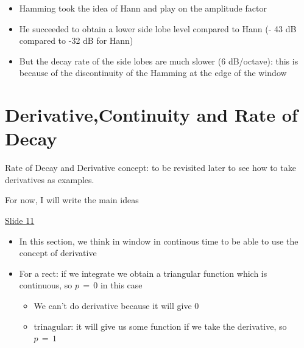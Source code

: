 \documentclass[12pt,a4paper]{book}
\begin{document}
\begin{itemize}
    \begin{itemize}
        \item Hamming took the idea of Hann and play on the amplitude factor
        
        \item He succeeded to obtain a lower side lobe level compared to Hann (- 43 dB compared to -32 dB for Hann)
        
        \item But the decay rate of the side lobes are much slower (6 dB/octave): this is because of the discontinuity of  the Hamming at the edge of the window
        
    \end{itemize}


\end{itemize}


\section{Derivative,Continuity and Rate of Decay}

 Rate of Decay and Derivative concept: to be revisited later to see how to take derivatives as examples.

For now, I will write the main ideas

\underline{Slide 11}

\begin{itemize}
    \item In this section, we think in window in continous time to be able to use the concept of derivative
    
    \item For a rect: if we integrate we obtain a triangular function which is continuous, so $p \, = \, 0$ in this case
    
        \begin{itemize}
            \item We can't do derivative because it will give 0 
            
            \item trinagular: it will give us some function if we take the derivative, so $p \, = \, 1$
        \end{itemize}
    
    
\end{itemize}


\end{document}
